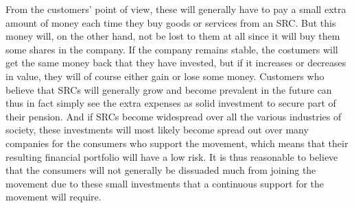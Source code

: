 \documentclass{article}
\begin{document}
From the customers' point of view, these will generally have to pay a small extra amount of money each time they buy goods or services from an SRC. But this money will, on the other hand, not be lost to them at all since it will buy them some shares in the company. If the company remains stable, the costumers will get the same money back that they have invested, but if it increases or decreases in value, they will of course either gain or lose some money. 
Customers who believe that SRCs will generally grow and become prevalent in the future can thus in fact simply see the extra expenses as solid investment to secure part of their pension. And if SRCs become widespread over all the various industries of society, these investments will most likely become spread out over many companies for the consumers who support the movement, which means that their resulting financial portfolio will have a low risk. It is thus reasonable to believe that the consumers will not generally be dissuaded much from joining the movement due to these small investments that a continuous support for the movement will require. 

\end{document}
